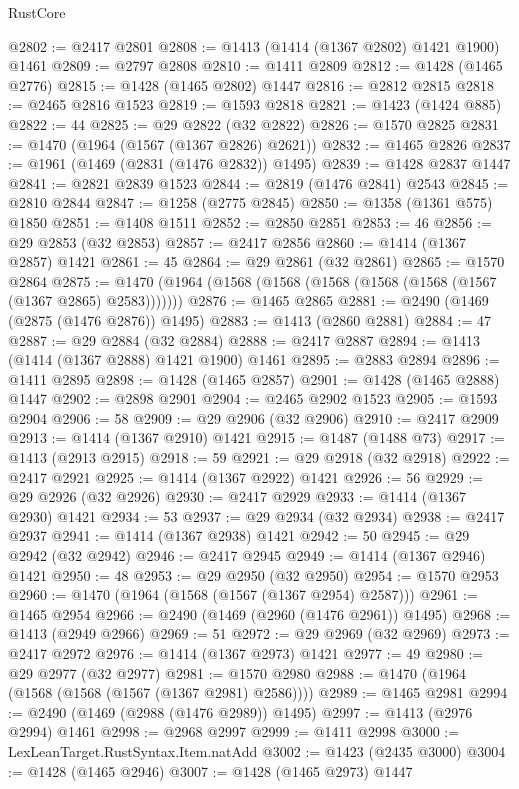 \begin{lexlean}{RustCore}
\begin{coremodule}
@2802 := @2417 @2801
@2808 := @1413 (@1414 (@1367 @2802) @1421 @1900) @1461
@2809 := @2797 @2808
@2810 := @1411 @2809
@2812 := @1428 (@1465 @2776)
@2815 := @1428 (@1465 @2802) @1447
@2816 := @2812 @2815
@2818 := @2465 @2816 @1523
@2819 := @1593 @2818
@2821 := @1423 (@1424 @885)
@2822 := 44
@2825 := @29 @2822 (@32 @2822)
@2826 := @1570 @2825
@2831 := @1470 (@1964 (@1567 (@1367 @2826) @2621))
@2832 := @1465 @2826
@2837 := @1961 (@1469 (@2831 (@1476 @2832)) @1495)
@2839 := @1428 @2837 @1447
@2841 := @2821 @2839 @1523
@2844 := @2819 (@1476 @2841) @2543
@2845 := @2810 @2844
@2847 := @1258 (@2775 @2845)
@2850 := @1358 (@1361 @575) @1850
@2851 := @1408 @1511
@2852 := @2850 @2851
@2853 := 46
@2856 := @29 @2853 (@32 @2853)
@2857 := @2417 @2856
@2860 := @1414 (@1367 @2857) @1421
@2861 := 45
@2864 := @29 @2861 (@32 @2861)
@2865 := @1570 @2864
@2875 := @1470 (@1964 (@1568 (@1568 (@1568 (@1568 (@1568 (@1567 (@1367 @2865) @2583)))))))
@2876 := @1465 @2865
@2881 := @2490 (@1469 (@2875 (@1476 @2876)) @1495)
@2883 := @1413 (@2860 @2881)
@2884 := 47
@2887 := @29 @2884 (@32 @2884)
@2888 := @2417 @2887
@2894 := @1413 (@1414 (@1367 @2888) @1421 @1900) @1461
@2895 := @2883 @2894
@2896 := @1411 @2895
@2898 := @1428 (@1465 @2857)
@2901 := @1428 (@1465 @2888) @1447
@2902 := @2898 @2901
@2904 := @2465 @2902 @1523
@2905 := @1593 @2904
@2906 := 58
@2909 := @29 @2906 (@32 @2906)
@2910 := @2417 @2909
@2913 := @1414 (@1367 @2910) @1421
@2915 := @1487 (@1488 @73)
@2917 := @1413 (@2913 @2915)
@2918 := 59
@2921 := @29 @2918 (@32 @2918)
@2922 := @2417 @2921
@2925 := @1414 (@1367 @2922) @1421
@2926 := 56
@2929 := @29 @2926 (@32 @2926)
@2930 := @2417 @2929
@2933 := @1414 (@1367 @2930) @1421
@2934 := 53
@2937 := @29 @2934 (@32 @2934)
@2938 := @2417 @2937
@2941 := @1414 (@1367 @2938) @1421
@2942 := 50
@2945 := @29 @2942 (@32 @2942)
@2946 := @2417 @2945
@2949 := @1414 (@1367 @2946) @1421
@2950 := 48
@2953 := @29 @2950 (@32 @2950)
@2954 := @1570 @2953
@2960 := @1470 (@1964 (@1568 (@1567 (@1367 @2954) @2587)))
@2961 := @1465 @2954
@2966 := @2490 (@1469 (@2960 (@1476 @2961)) @1495)
@2968 := @1413 (@2949 @2966)
@2969 := 51
@2972 := @29 @2969 (@32 @2969)
@2973 := @2417 @2972
@2976 := @1414 (@1367 @2973) @1421
@2977 := 49
@2980 := @29 @2977 (@32 @2977)
@2981 := @1570 @2980
@2988 := @1470 (@1964 (@1568 (@1568 (@1567 (@1367 @2981) @2586))))
@2989 := @1465 @2981
@2994 := @2490 (@1469 (@2988 (@1476 @2989)) @1495)
@2997 := @1413 (@2976 @2994) @1461
@2998 := @2968 @2997
@2999 := @1411 @2998
@3000 := LexLeanTarget.RustSyntax.Item.natAdd
@3002 := @1423 (@2435 @3000)
@3004 := @1428 (@1465 @2946)
@3007 := @1428 (@1465 @2973) @1447

\end{coremodule}
\end{lexlean}
